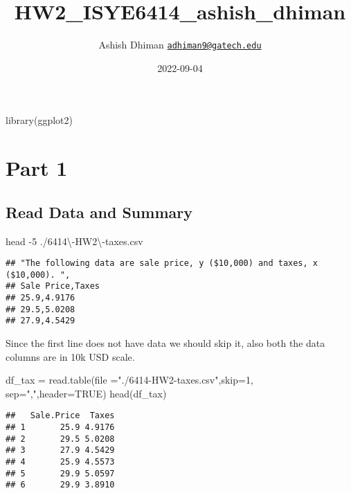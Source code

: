 \documentclass[
]{article}
\title{HW2\_ISYE6414\_ashish\_dhiman}
\author{Ashish Dhiman \textbar{}
\href{mailto:adhiman9@gatech.edu}{\nolinkurl{adhiman9@gatech.edu}}}
\date{2022-09-04}
\newenvironment{Shaded}{\begin{snugshade}}{\end{snugshade}}
\newcommand{\AttributeTok}[1]{\textcolor[rgb]{0.77,0.63,0.00}{#1}}
\newcommand{\ConstantTok}[1]{\textcolor[rgb]{0.00,0.00,0.00}{#1}}
\newcommand{\DecValTok}[1]{\textcolor[rgb]{0.00,0.00,0.81}{#1}}
\newcommand{\FunctionTok}[1]{\textcolor[rgb]{0.00,0.00,0.00}{#1}}
\newcommand{\NormalTok}[1]{#1}
\newcommand{\OtherTok}[1]{\textcolor[rgb]{0.56,0.35,0.01}{#1}}
\newcommand{\StringTok}[1]{\textcolor[rgb]{0.31,0.60,0.02}{#1}}
\begin{document}
\maketitle

\begin{Shaded}
\begin{Highlighting}[]
\FunctionTok{library}\NormalTok{(ggplot2)}
\end{Highlighting}
\end{Shaded}

\hypertarget{part-1}{%
\section{Part 1}\label{part-1}}

\hypertarget{read-data-and-summary}{%
\subsection{Read Data and Summary}\label{read-data-and-summary}}

\begin{Shaded}
\begin{Highlighting}[]
\FunctionTok{head} \AttributeTok{{-}5}\NormalTok{ ./6414\textbackslash{}{-}HW2\textbackslash{}{-}taxes.csv}
\end{Highlighting}
\end{Shaded}

\begin{verbatim}
## ﻿"The following data are sale price, y ($10,000) and taxes, x ($10,000). ",
## Sale Price,Taxes
## 25.9,4.9176
## 29.5,5.0208
## 27.9,4.5429
\end{verbatim}

Since the first line does not have data we should skip it, also both the
data columns are in 10k USD scale.

\begin{Shaded}
\begin{Highlighting}[]
\NormalTok{df\_tax }\OtherTok{=} \FunctionTok{read.table}\NormalTok{(}\AttributeTok{file =}\StringTok{"./6414{-}HW2{-}taxes.csv"}\NormalTok{,}\AttributeTok{skip=}\DecValTok{1}\NormalTok{, }\AttributeTok{sep=}\StringTok{","}\NormalTok{,}\AttributeTok{header=}\ConstantTok{TRUE}\NormalTok{)}
\FunctionTok{head}\NormalTok{(df\_tax)}
\end{Highlighting}
\end{Shaded}

\begin{verbatim}
##   Sale.Price  Taxes
## 1       25.9 4.9176
## 2       29.5 5.0208
## 3       27.9 4.5429
## 4       25.9 4.5573
## 5       29.9 5.0597
## 6       29.9 3.8910
\end{verbatim}
\end{document}
